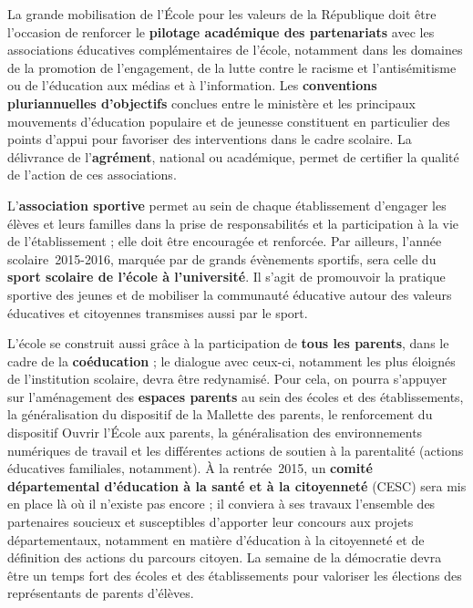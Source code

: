 La grande mobilisation de l’École pour les valeurs de la République doit être l’occasion de renforcer le \textbf{pilotage académique des partenariats} avec les associations éducatives complémentaires de l’école, notamment dans les domaines de la promotion de l’engagement, de la lutte contre le racisme et l’antisémitisme ou de l’éducation aux médias et à l’information. Les \textbf{conventions pluriannuelles d’objectifs} conclues entre le ministère et les principaux mouvements d’éducation populaire et de jeunesse constituent en particulier des points d’appui pour favoriser des interventions dans le cadre scolaire. La délivrance de l’\textbf{agrément}, national ou académique, permet de certifier la qualité de l’action de ces associations.

L’\textbf{association sportive} permet au sein de chaque établissement d’engager les élèves et leurs familles dans la prise de responsabilités et la participation à la vie de l’établissement ; elle doit être encouragée et renforcée. Par ailleurs, l’année scolaire~2015-2016, marquée par de grands évènements sportifs, sera celle du \textbf{sport scolaire de l’école à l’université}. Il s’agit de promouvoir la pratique sportive des jeunes et de mobiliser la communauté éducative autour des valeurs éducatives et citoyennes transmises aussi par le sport. 

L’école se construit aussi grâce à la participation de \textbf{tous les parents}, dans le cadre de la \textbf{coéducation} ; le dialogue avec ceux-ci, notamment les plus éloignés de l’institution scolaire, devra être redynamisé. Pour cela, on pourra s’appuyer sur l’aménagement des \textbf{espaces parents} au sein des écoles et des établissements, la généralisation du dispositif de la Mallette des parents, le renforcement du dispositif Ouvrir l’École aux parents, la généralisation des environnements numériques de travail et les différentes actions de soutien à la parentalité (actions éducatives familiales, notamment). À la rentrée~2015, un \textbf{comité départemental d’éducation à la santé et à la citoyenneté} (CESC) sera mis en place là où il n’existe pas encore ; il conviera à ses travaux l’ensemble des partenaires soucieux et susceptibles d’apporter leur concours aux projets départementaux, notamment en matière d’éducation à la citoyenneté et de définition des actions du parcours citoyen. La semaine de la démocratie devra être un temps fort des écoles et des établissements pour valoriser les élections des représentants de parents d’élèves.

